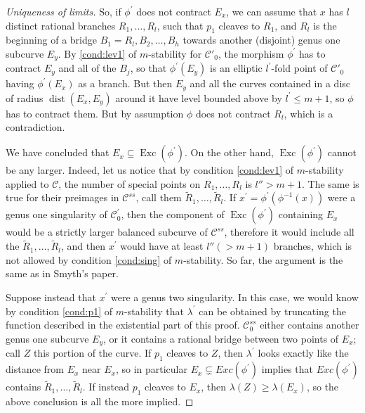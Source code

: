 \documentclass{compositio}
\newcommand{\on}{\operatorname}
\theoremstyle{plain}
\theoremstyle{definition}
\theoremstyle{remark}
\begin{document}
{{\begin{proof}[Uniqueness of limits]
So, if $\phi^\prime$ does not contract $E_x$, we can assume that $x$ has $l$ distinct rational branches $R_1,\ldots,R_l$, such that $p_1$ cleaves to $R_1$, and $R_l$ is the beginning of a bridge $B_1=R_l,B_2,\ldots,B_h$ towards another (disjoint) genus one subcurve $E_y$. By \eqref{cond:lev1} of $m$-stability for $\mathcal C'_0$, the morphism $\phi^\prime$ has to contract $E_y$ and all of the $B_j$, so that $\phi^\prime(E_y)$ is an elliptic $l^\prime$-fold point of $\mathcal C'_0$ having $\phi^\prime(E_x)$ as a branch. But then $E_y$ and all the curves contained in a disc of radius $\on{dist}(E_x,E_y)$ around it have level bounded above by $l^\prime\leq m+1$, so $\phi$ has to contract them. But by assumption $\phi$ does not contract $R_l$, which is a contradiction.

We have concluded that $E_x\subseteq\on{Exc}(\phi^\prime)$.
 On the other hand, $\on{Exc}(\phi^\prime)$ cannot be any larger. Indeed, let us notice that by condition \eqref{cond:lev1} of $m$-stability applied to $\mathcal C$, the number of special points on $R_1,\ldots,R_l$ is $l'' > m+1$. The same is true for their preimages in $\mathcal C^{ss}$, call them $\widetilde R_1,\ldots,\widetilde R_l$. If $x^\prime=\phi^\prime(\phi^{-1}(x))$ were a genus one singularity of $\mathcal C^\prime_0$, then the component of $\on{Exc}(\phi^\prime)$ containing $E_x$ would be a strictly larger balanced subcurve of $\mathcal C^{ss}$, therefore it would include all the $\widetilde R_1,\ldots,\widetilde R_l$, and then $x^\prime$ would have at least $l''(>m+1)$ branches, which is not allowed by condition \eqref{cond:sing} of $m$-stability. So far, the argument is the same as in Smyth's paper.
 
 Suppose instead that $x^\prime$ were a genus two singularity. In this case, we would know by condition \eqref{cond:p1} of $m$-stability that $\lambda^\prime$ can be obtained by truncating the function described in the existential part of this proof. $\mathcal C^{ss}_0$ either contains another genus one subcurve $E_y$, or it contains a rational bridge between two points of $E_x$; call $Z$ this portion of the curve. If $p_1$ cleaves to $Z$, then $\lambda^\prime$ looks exactly like the distance from $E_x$ near $E_x$, so in particular $E_x\subsetneq {Exc}(\phi^\prime)$ implies that ${Exc}(\phi^\prime)$ contains $\widetilde R_1,\ldots,\widetilde R_l$. If instead $p_1$ cleaves to $E_x$, then $\lambda(Z)\geq\lambda(E_x)$, so the above conclusion is all the more implied.
 
\end{proof}


}}
\end{document}
